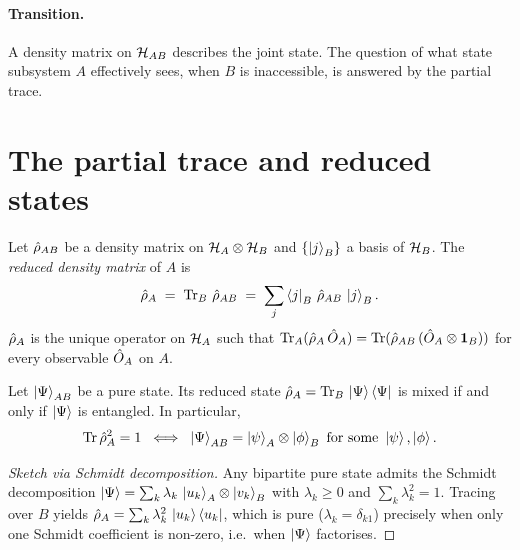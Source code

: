 \paragraph{Transition.}
A density matrix on $\mathcal{H}_{AB}$ describes the joint state. The
question of what state subsystem $A$ effectively sees, when $B$ is
inaccessible, is answered by the partial trace.

\section{The partial trace and reduced states}
\label{sec:partial-trace}

\begin{definition}
\label{def:partial-trace}
Let $\hat{\rho}_{AB}$ be a density matrix on
$\mathcal{H}_A\otimes\mathcal{H}_B$ and $\{\ket{j}_B\}$ a basis of
$\mathcal{H}_B$. The \emph{reduced density matrix} of $A$ is
\begin{equation}
\label{eq:partial-trace}
\hat{\rho}_A \;=\; \operatorname{Tr}_B\,\hat{\rho}_{AB}
\;=\; \sum_j \bra{j}_B\,\hat{\rho}_{AB}\,\ket{j}_B.
\end{equation}
$\hat{\rho}_A$ is the unique operator on $\mathcal{H}_A$ such that
$\operatorname{Tr}_A(\hat{\rho}_A\,\hat{O}_A)=\operatorname{Tr}(\hat{\rho}_{AB}\,(\hat{O}_A\otimes\mathbf{1}_B))$
for every observable $\hat{O}_A$ on $A$.
\end{definition}

\begin{statement}
\label{stmt:reduced-pure}
Let $\ket{\Psi}_{AB}$ be a pure state. Its reduced state
$\hat{\rho}_A=\operatorname{Tr}_B\,\ket{\Psi}\bra{\Psi}$ is mixed if and only if
$\ket{\Psi}$ is entangled. In particular,
\begin{equation}
\operatorname{Tr}\hat{\rho}_A^2 = 1 \;\;\Longleftrightarrow\;\;
\ket{\Psi}_{AB} = \ket{\psi}_A\otimes\ket{\phi}_B
\text{ for some }\ket{\psi},\ket{\phi}.
\end{equation}
\end{statement}

\begin{proof}[Sketch via Schmidt decomposition]
Any bipartite pure state admits the Schmidt decomposition
$\ket{\Psi}=\sum_k \lambda_k\,\ket{u_k}_A\otimes\ket{v_k}_B$ with
$\lambda_k\geq0$ and $\sum_k\lambda_k^2=1$. Tracing over $B$ yields
$\hat{\rho}_A=\sum_k\lambda_k^2\,\ket{u_k}\bra{u_k}$, which is pure
($\lambda_k=\delta_{k1}$) precisely when only one Schmidt coefficient
is non-zero, i.e.\ when $\ket{\Psi}$ factorises.
\end{proof}

